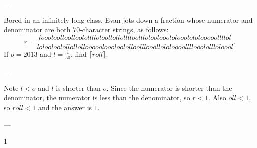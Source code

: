 
---

Bored in an infinitely long class, Evan jots down a fraction whose numerator and denominator are both $70$-character strings, as follows: \[r=\frac{loooloolloolloololllloloollollolllloollloloolooololooolololooooollllol}
{lolooloolollollolloooooloooloololloolllooollololoooollllooolollloloool}.\]
If $o=2013$ and $l=\frac1{50}$, find $\lceil roll\rceil$.

---

Note $l<o$ and $l$ is shorter than $o$. Since the numerator is shorter than the denominator, the numerator is less than the denominator, so $r<1$. Also $oll<1$, so $roll<1$ and the answer is $1$.

---

1
